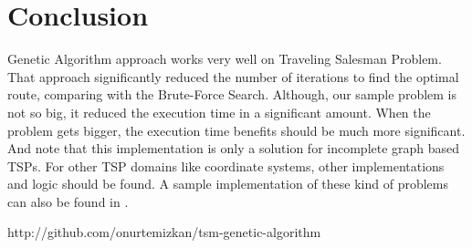 \documentclass[journal,transmag]{IEEEtran}
\begin{document}
    \section{Conclusion}

    Genetic Algorithm approach works very well on Traveling Salesman Problem.
    That approach significantly reduced the number of iterations to find the
    optimal route, comparing with the Brute-Force Search. Although, our sample
    problem is not so big, it reduced the execution time in a significant
    amount. When the problem gets bigger, the execution time benefits should be
    much more significant. And note that this implementation is only a solution
    for incomplete graph based TSPs. For other TSP domains like coordinate
    systems, other implementations and logic should be found. A sample
    implementation of these kind of problems can also be found in
    \cite{code_repository}.

    \ifCLASSOPTIONcaptionsoff
      \newpage
    \fi

    \begin{thebibliography}{1}

    http://github.com/onurtemizkan/tsm-genetic-algorithm
    \end{thebibliography}

    
\end{document}
